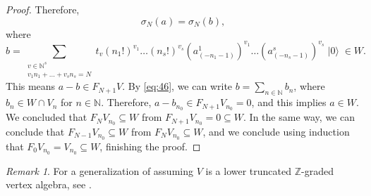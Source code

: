 \documentclass[a4paper, 12pt, reqno]{amsart}
\theoremstyle{remark}
\newtheorem{remark}[theorem]{Remark}
\DeclareMathOperator{\vac}{|0\rangle}
\begin{document}
\begin{proof}
  Therefore,
  \begin{equation*}
    \sigma_N(a) = \sigma_N(b),
  \end{equation*}
  where
  \begin{equation*}
    b = \sum_{\substack{v \in \mathbb{N}^s \\ v_1n_1 + \dots + v_sn_s = N}}t_v(n_1!)^{v_1}\dots(n_s!)^{v_s}(a^1_{(-n_1 - 1)})^{v_1}\dots(a^s_{(-n_s - 1)})^{v_s}\vac \in W.
  \end{equation*}
  This means $a - b \in F_{N + 1}V$.
  By \eqref{eq:46}, we can write $b = \sum_{n \in \mathbb{N}}b_n$, where $b_n \in W \cap V_n$ for $n \in \mathbb{N}$.
  Therefore, $a - b_{n_0} \in F_{N + 1}V_{n_0} = 0$, and this implies $a \in W$.
  We concluded that $F_NV_{n_0} \subseteq W$ from $F_{N + 1}V_{n_0} = 0 \subseteq W$.
  In the same way, we can conclude that $F_{N - 1}V_{n_0} \subseteq W$ from $F_NV_{n_0} \subseteq W$, and we conclude using induction that $F_0V_{n_0} = V_{n_0} \subseteq W$, finishing the proof.
\end{proof}

\begin{remark}
  \label{rmk:46}
  For a generalization of  assuming $V$ is a lower truncated $\mathbb{Z}$-graded vertex algebra, see \cite[Theorem 4.8]{li_abelianizing_2005}.
\end{remark}
\end{document}
